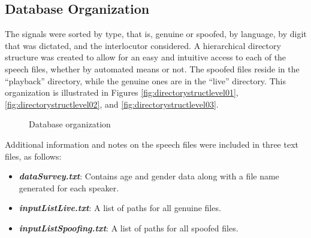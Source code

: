 	\subsection{Database Organization}
		\par The signals were sorted by type, that is, genuine or spoofed, by language, by digit that was dictated, and the interlocutor considered. A hierarchical directory structure was created to allow for an easy and intuitive access to each of the speech files, whether by automated means or not. The spoofed files reside in the ``playback'' directory, while the genuine ones are in the ``live'' directory. This organization is illustrated in Figures \ref{fig:directorystructlevel01}, \ref{fig:directorystructlevel02}, and \ref{fig:directorystructlevel03}.
		\begin{figure}[ht]
			\centering
			\caption{Database organization}
			\label{fig:directorystructlevel010203}
		\end{figure}
		\par Additional information and notes on the speech files were included in three text files, as follows:
		\\
		\begin{itemize}
			\item \textit{\textbf{dataSurvey.txt}}: Contains age and gender data along with a file name generated for each speaker.
			\item \textit{\textbf{inputListLive.txt}}: A list of paths for all genuine files.
			\item \textit{\textbf{inputListSpoofing.txt}}: A list of paths for all spoofed files.
		\end{itemize}
		
